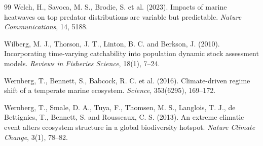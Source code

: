 \begin{thebibliography}{99}
Welch, H., Savoca, M. S., Brodie, S. et al. (2023). Impacts of marine heatwaves on top predator distributions are variable but predictable. \textit{Nature Communications}, 14, 5188.

Wilberg, M. J., Thorson, J. T., Linton, B. C. and Berkson, J. (2010). Incorporating time-varying catchability into population dynamic stock assessment models. \textit{Reviews in Fisheries Science}, 18(1), 7--24.

Wernberg, T., Bennett, S., Babcock, R. C. et al. (2016). Climate-driven regime shift of a temperate marine ecosystem. \textit{Science}, 353(6295), 169--172.

Wernberg, T., Smale, D. A., Tuya, F., Thomsen, M. S., Langlois, T. J., de Bettignies, T., Bennett, S. and Rousseaux, C. S. (2013). An extreme climatic event alters ecosystem structure in a global biodiversity hotspot. \textit{Nature Climate Change}, 3(1), 78--82.

\end{thebibliography}